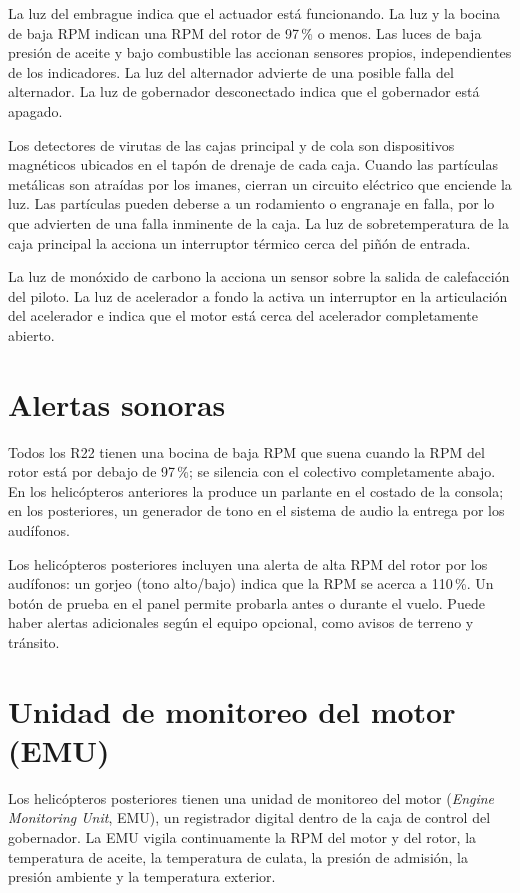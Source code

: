 La luz del embrague indica que el actuador está funcionando. La luz y la bocina de baja RPM indican una RPM del rotor de 97\,\% o menos. Las luces de baja presión de aceite y bajo combustible las accionan sensores propios, independientes de los indicadores. La luz del alternador advierte de una posible falla del alternador. La luz de gobernador desconectado indica que el gobernador está apagado.

Los detectores de virutas de las cajas principal y de cola son dispositivos magnéticos ubicados en el tapón de drenaje de cada caja. Cuando las partículas metálicas son atraídas por los imanes, cierran un circuito eléctrico que enciende la luz. Las partículas pueden deberse a un rodamiento o engranaje en falla, por lo que advierten de una falla inminente de la caja. La luz de sobretemperatura de la caja principal la acciona un interruptor térmico cerca del piñón de entrada.

La luz de monóxido de carbono la acciona un sensor sobre la salida de calefacción del piloto. La luz de acelerador a fondo la activa un interruptor en la articulación del acelerador e indica que el motor está cerca del acelerador completamente abierto.

\section{Alertas sonoras}

Todos los R22 tienen una bocina de baja RPM que suena cuando la RPM del rotor está por debajo de 97\,\%; se silencia con el colectivo completamente abajo. En los helicópteros anteriores la produce un parlante en el costado de la consola; en los posteriores, un generador de tono en el sistema de audio la entrega por los audífonos.

Los helicópteros posteriores incluyen una alerta de alta RPM del rotor por los audífonos: un gorjeo (tono alto/bajo) indica que la RPM se acerca a 110\,\%. Un botón de prueba en el panel permite probarla antes o durante el vuelo. Puede haber alertas adicionales según el equipo opcional, como avisos de terreno y tránsito.

\section{Unidad de monitoreo del motor (EMU)}

Los helicópteros posteriores tienen una unidad de monitoreo del motor (\emph{Engine Monitoring Unit}, EMU), un registrador digital dentro de la caja de control del gobernador. La EMU vigila continuamente la RPM del motor y del rotor, la temperatura de aceite, la temperatura de culata, la presión de admisión, la presión ambiente y la temperatura exterior.

